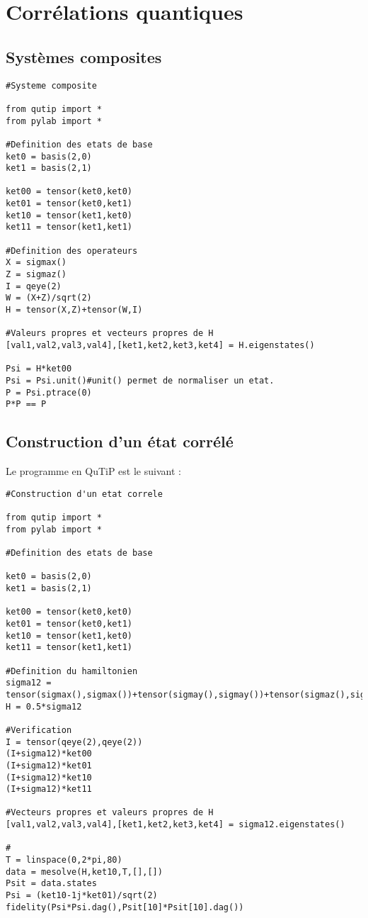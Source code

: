 \documentclass[a4paper,12pt]{book}
\numberwithin{equation}{section}
\begin{document}
\section{Corrélations quantiques}
\subsection{Systèmes composites}
\begin{lstlisting}
#Systeme composite

from qutip import *
from pylab import *

#Definition des etats de base
ket0 = basis(2,0)
ket1 = basis(2,1)

ket00 = tensor(ket0,ket0)
ket01 = tensor(ket0,ket1)
ket10 = tensor(ket1,ket0)
ket11 = tensor(ket1,ket1)

#Definition des operateurs
X = sigmax()
Z = sigmaz()
I = qeye(2)
W = (X+Z)/sqrt(2)
H = tensor(X,Z)+tensor(W,I)

#Valeurs propres et vecteurs propres de H
[val1,val2,val3,val4],[ket1,ket2,ket3,ket4] = H.eigenstates()

Psi = H*ket00
Psi = Psi.unit()#unit() permet de normaliser un etat.
P = Psi.ptrace(0)
P*P == P

\end{lstlisting}

\subsection{Construction d'un état corrélé}
Le programme en QuTiP est le suivant :
\begin{lstlisting}
#Construction d'un etat correle

from qutip import *
from pylab import *

#Definition des etats de base

ket0 = basis(2,0)
ket1 = basis(2,1)

ket00 = tensor(ket0,ket0)
ket01 = tensor(ket0,ket1)
ket10 = tensor(ket1,ket0)
ket11 = tensor(ket1,ket1)

#Definition du hamiltonien
sigma12 = tensor(sigmax(),sigmax())+tensor(sigmay(),sigmay())+tensor(sigmaz(),sigmaz())
H = 0.5*sigma12

#Verification
I = tensor(qeye(2),qeye(2))
(I+sigma12)*ket00
(I+sigma12)*ket01
(I+sigma12)*ket10
(I+sigma12)*ket11

#Vecteurs propres et valeurs propres de H
[val1,val2,val3,val4],[ket1,ket2,ket3,ket4] = sigma12.eigenstates()

#
T = linspace(0,2*pi,80)
data = mesolve(H,ket10,T,[],[])
Psit = data.states
Psi = (ket10-1j*ket01)/sqrt(2)
fidelity(Psi*Psi.dag(),Psit[10]*Psit[10].dag())

\end{lstlisting}
\end{document}
